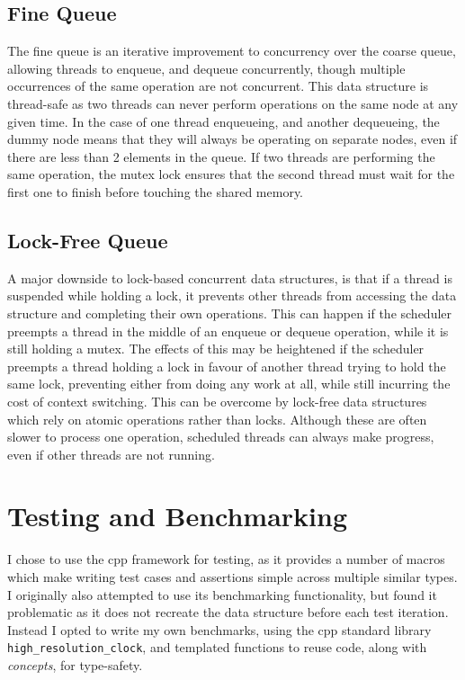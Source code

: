 \documentclass{article}
\begin{document}
\subsection{Fine Queue}
The fine queue is an iterative improvement to concurrency over the coarse queue,
allowing threads to enqueue, and dequeue concurrently, though multiple
occurrences of the same operation are not concurrent. This data structure is
thread-safe as two threads can never perform operations on the same node at any
given time. In the case of one thread enqueueing, and another dequeueing, the
dummy node means that they will always be operating on separate nodes, even if
there are less than 2 elements in the queue. If two threads are performing the
same operation, the mutex lock ensures that the second thread must wait for the
first one to finish before touching the shared memory.

\subsection{Lock-Free Queue}
A major downside to lock-based concurrent data structures, is that if a thread
is suspended while holding a lock, it prevents other threads from accessing the
data structure and completing their own operations. This can happen if the
scheduler preempts a thread in the middle of an enqueue or dequeue operation,
while it is still holding a mutex. The effects of this may be heightened if the
scheduler preempts a thread holding a lock in favour of another thread trying to
hold the same lock, preventing either from doing any work at all, while still
incurring the cost of context switching. This can be overcome by lock-free
data structures which rely on atomic operations rather than locks. Although
these are often slower to process one operation, scheduled threads can always
make progress, even if other threads are not running. 

\section{Testing and Benchmarking}
I chose to use the cpp \cite{catch2} framework for testing, as it provides a
number of macros which make writing test cases and assertions simple across
multiple similar types. I originally also attempted to use its benchmarking
functionality, but found it problematic as it does not recreate the data
structure before each test iteration. Instead I opted to write my own
benchmarks, using the cpp standard library \verb|high_resolution_clock|, and
templated functions to reuse code, along with \textit{concepts}, for
type-safety.
\end{document}
